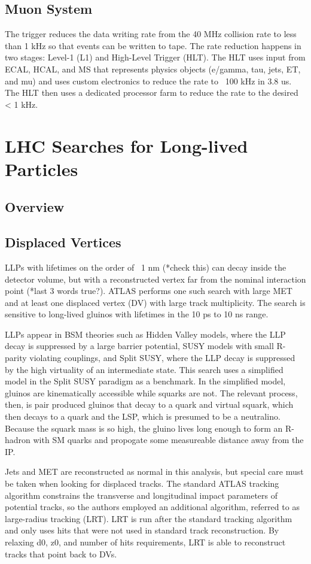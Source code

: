 \documentclass[12pt]{article}
\begin{document}
\subsection{Muon System}
        The trigger reduces the data writing rate from the 40 MHz collision rate to less than 1 kHz so that events can be written to tape. The rate reduction happens in two stages: Level-1 (L1) and High-Level Trigger (HLT). The HLT uses input from ECAL, HCAL, and MS that represents physics objects (e/gamma, tau, jets, ET, and mu) and uses custom electronics to reduce the rate to ~100 kHz in 3.8 us. The HLT then uses a dedicated processor farm to reduce the rate to the desired < 1 kHz.

\section{LHC Searches for Long-lived Particles}
\subsection{Overview}
\subsection{Displaced Vertices}
            LLPs with lifetimes on the order of ~1 nm (*check this) can decay inside the detector volume, but with a reconstructed vertex far from the nominal interaction point (*last 3 words true?). ATLAS performs one such search with large MET and at least one displaced vertex (DV) with large track multiplicity. The search is sensitive to long-lived gluinos with lifetimes in the 10 ps to 10 ns range.

            LLPs appear in BSM theories such as Hidden Valley models, where the LLP decay is suppressed by a large barrier potential, SUSY models with small R-parity violating couplings, and Split SUSY, where the LLP decay is suppressed by the high virtuality of an intermediate state. This search uses a simplified model in the Split SUSY paradigm as a benchmark. In the simplified model, gluinos are kinematically accessible while squarks are not. The relevant process, then, is pair produced gluinos that decay to a quark and virtual squark, which then decays to a quark and the LSP, which is presumed to be a neutralino. Because the squark mass is so high, the gluino lives long enough to form an R-hadron with SM quarks and propogate some measureable distance away from the IP. 

            Jets and MET are reconstructed as normal in this analysis, but special care must be taken when looking for displaced tracks. The standard ATLAS tracking algorithm constrains the transverse and longitudinal impact parameters of potential tracks, so the authors employed an additional algorithm, referred to as large-radius tracking (LRT). LRT is run after the standard tracking algorithm and only uses hits that were not used in standard track reconstruction. By relaxing d0, z0, and number of hits requirements, LRT is able to reconstruct tracks that point back to DVs.
            
\end{document}
